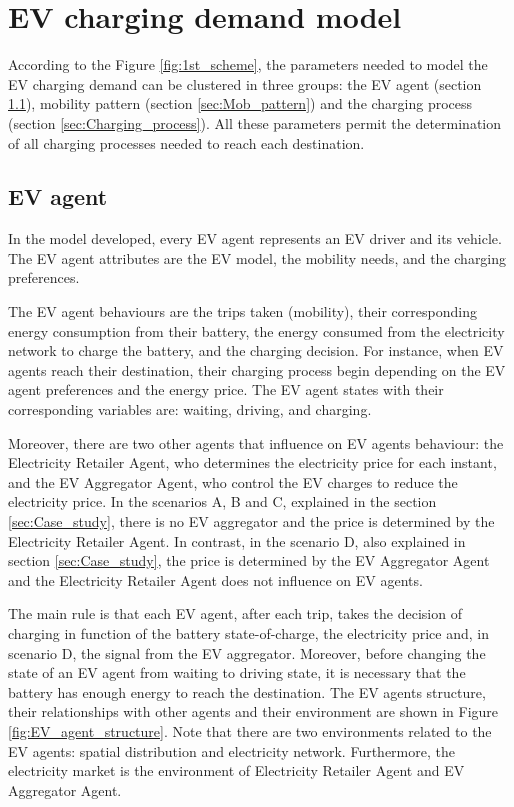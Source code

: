 \documentclass[a4paper,11pt,twoside,openright]{report}
\begin{document}
\section{EV charging demand model}\label{sec:Model}

According to the Figure \ref{fig:1st_scheme}, the parameters needed to model the EV charging demand can be clustered in three groups: the EV agent (section \ref{sec:EV_agent}), mobility pattern (section \ref{sec:Mob_pattern}) and the charging process (section \ref{sec:Charging_process}). All these parameters permit the determination of all charging processes needed to reach each destination.

\subsection{EV agent} \label{sec:EV_agent}

In the model developed, every EV agent represents an EV driver and its vehicle. The EV agent attributes are the EV model, the mobility needs, and the charging preferences.

The EV agent behaviours are the trips taken (mobility), their corresponding energy consumption from their battery, the energy consumed from the electricity network to charge the battery, and the charging decision. For instance, when EV agents reach their destination, their charging process begin depending on the EV agent preferences and the energy price.
The EV agent states with their corresponding variables are: waiting, driving, and charging.

Moreover, there are two other agents that influence on EV agents behaviour: the Electricity Retailer Agent, who determines the electricity price for each instant, and the EV Aggregator Agent, who control the EV charges to reduce the electricity price. In the scenarios A, B and C, explained in the section \ref{sec:Case_study}, there is no EV aggregator and the price is determined by the Electricity Retailer Agent. In contrast, in the scenario D, also explained in section \ref{sec:Case_study}, the price is determined by the EV Aggregator Agent and the Electricity Retailer Agent does not influence on EV agents.

The main rule is that each EV agent, after each trip, takes the decision of charging in function of the battery state-of-charge, the electricity price and, in scenario D, the signal from the EV aggregator. Moreover, before changing the state of an EV agent from waiting to driving state, it is necessary that the battery has enough energy to reach the destination. The EV agents structure, their relationships with other agents and their environment are shown in Figure \ref{fig:EV_agent_structure}. Note that there are two environments related to the EV agents: spatial distribution and electricity network. Furthermore, the electricity market is the environment of Electricity Retailer Agent and EV Aggregator Agent.
\end{document}
